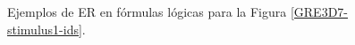 \begin{figure}[H]
\begin{subfigure}{.6\textwidth}
\vspace*{0.5cm}
%
%
%
%
%
%
%
%



\vspace*{1cm}

\end{subfigure}%
\caption{Ejemplos de ER en f\'ormulas l\'ogicas para la Figura \ref{GRE3D7-stimulus1-ids}.}
\label{formulas-stimulus1}
\end{figure}




